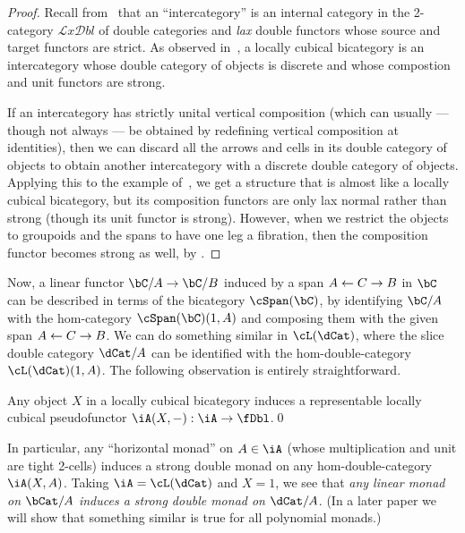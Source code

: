 \documentclass{amsart}
\def\lxdbl{\ensuremath{\mathcal{L}\mathit{x}\mathcal{D}\mathit{bl}}\xspace}
\begin{document}
\begin{proof}
  Recall from~\cite{gp:intercategories-i,gp:intercategories-ii} that an ``intercategory'' is an internal category in the 2-category \lxdbl of double categories and \emph{lax} double functors whose source and target functors are strict.
  As observed in~\cite[3.5]{gp:intercategories-ii}, a locally cubical bicategory is an intercategory whose double category of objects is discrete and whose compostion and unit functors are strong.

  If an intercategory has strictly unital vertical composition (which can usually --- though not always --- be obtained by redefining vertical composition at identities), then we can discard all the arrows and cells in its double category of objects to obtain another intercategory with a discrete double category of objects.
  Applying this to the example of~\cite[6.5]{gp:intercategories-ii}, we get a structure that is almost like a locally cubical bicategory, but its composition functors are only lax normal rather than strong (though its unit functor is strong).
  However, when we restrict the objects to groupoids and the spans to have one leg a fibration, then the composition functor becomes strong as well, by \cite[Proposition 49]{garner:double-clubs}.
\end{proof}

Now, a linear functor $\bC/A\to \bC/B$ induced by a span $A \leftarrow C \to B$ in $\bC$ can be described in terms of the bicategory $\cSpan(\bC)$, by identifying $\bC/A$ with the hom-category $\cSpan(\bC)(1,A)$ and composing them with the given span $A \leftarrow C \to B$.
We can do something similar in $\cL(\dCat)$, where the slice double category $\dCat/A$ can be identified with the hom-double-category $\cL(\dCat)(1,A)$.
The following observation is entirely straightforward.

\begin{thm}
  Any object $X$ in a locally cubical bicategory \iA induces a representable locally cubical pseudofunctor $\iA(X,-):\iA \to \fDbl$.\qed
\end{thm}

In particular, any ``horizontal monad'' on $A\in \iA$ (whose multiplication and unit are tight 2-cells) induces a strong double monad on any hom-double-category $\iA(X,A)$.
Taking $\iA=\cL(\dCat)$ and $X=1$, we see that \emph{any linear monad on $\bCat/A$ induces a strong double monad on $\dCat/A$}.
(In a later paper we will show that something similar is true for all polynomial monads.)
\end{document}
